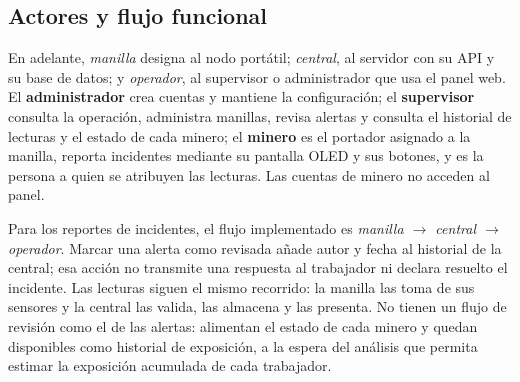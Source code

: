 \documentclass[10pt,a4paper]{article}
\begin{document}
\subsection{Actores y flujo funcional}
En adelante, \emph{manilla} designa al nodo portátil; \emph{central}, al servidor con su API y su base de datos; y \emph{operador}, al supervisor o administrador que usa el panel web. El \textbf{administrador} crea cuentas y mantiene la configuración; el \textbf{supervisor} consulta la operación, administra manillas, revisa alertas y consulta el historial de lecturas y el estado de cada minero; el \textbf{minero} es el portador asignado a la manilla, reporta incidentes mediante su pantalla OLED y sus botones, y es la persona a quien se atribuyen las lecturas. Las cuentas de minero no acceden al panel.

Para los reportes de incidentes, el flujo implementado es \emph{manilla $\rightarrow$ central $\rightarrow$ operador}. Marcar una alerta como revisada añade autor y fecha al historial de la central; esa acción no transmite una respuesta al trabajador ni declara resuelto el incidente. Las lecturas siguen el mismo recorrido: la manilla las toma de sus sensores y la central las valida, las almacena y las presenta. No tienen un flujo de revisión como el de las alertas: alimentan el estado de cada minero y quedan disponibles como historial de exposición, a la espera del análisis que permita estimar la exposición acumulada de cada trabajador.
\end{document}
